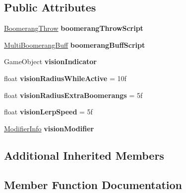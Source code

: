 \subsection*{Public Attributes}
\begin{DoxyCompactItemize}
\item 
\hypertarget{class_boomerang_vision_a51261f6e0e2f9179f58c6d85bec27d66}{}\label{class_boomerang_vision_a51261f6e0e2f9179f58c6d85bec27d66} 
\hyperlink{class_boomerang_throw}{Boomerang\+Throw} {\bfseries boomerang\+Throw\+Script}
\item 
\hypertarget{class_boomerang_vision_ab952b57b1e7c2081de6661a6e1cc6c0b}{}\label{class_boomerang_vision_ab952b57b1e7c2081de6661a6e1cc6c0b} 
\hyperlink{class_multi_boomerang_buff}{Multi\+Boomerang\+Buff} {\bfseries boomerang\+Buff\+Script}
\item 
\hypertarget{class_boomerang_vision_aba01921fd3dd17281a00b7ca14fbe5de}{}\label{class_boomerang_vision_aba01921fd3dd17281a00b7ca14fbe5de} 
Game\+Object {\bfseries vision\+Indicator}
\item 
\hypertarget{class_boomerang_vision_aa8a3432ee8344e7ddc5216be95fef3e5}{}\label{class_boomerang_vision_aa8a3432ee8344e7ddc5216be95fef3e5} 
float {\bfseries vision\+Radius\+While\+Active} = 10f
\item 
\hypertarget{class_boomerang_vision_a5bc4f9c92e5cf405571c7c37e1e53d89}{}\label{class_boomerang_vision_a5bc4f9c92e5cf405571c7c37e1e53d89} 
float {\bfseries vision\+Radius\+Extra\+Boomerangs} = 5f
\item 
\hypertarget{class_boomerang_vision_aa6143b9a5ae2f9a6e8ab6c88aeab003f}{}\label{class_boomerang_vision_aa6143b9a5ae2f9a6e8ab6c88aeab003f} 
float {\bfseries vision\+Lerp\+Speed} = 5f
\item 
\hypertarget{class_boomerang_vision_a1785d194d125b9b4b0925559514fa5fc}{}\label{class_boomerang_vision_a1785d194d125b9b4b0925559514fa5fc} 
\hyperlink{struct_modifier_info}{Modifier\+Info} {\bfseries vision\+Modifier}
\end{DoxyCompactItemize}
\subsection*{Additional Inherited Members}


\subsection{Member Function Documentation}
\hypertarget{class_boomerang_vision_ad267dac2d41e6069e922cf35cd3a0814}{}\label{class_boomerang_vision_ad267dac2d41e6069e922cf35cd3a0814} 
